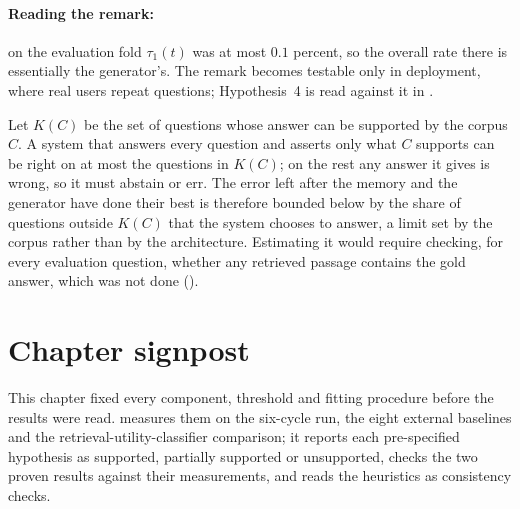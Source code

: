 \paragraph{Reading the remark:} on the evaluation fold $\tau_{1}(t)$ was at most $0.1$ percent, so the overall rate there is essentially the generator's. The remark becomes testable only in deployment, where real users repeat questions; Hypothesis~4 is read against it in .

\begin{remark}
\label{cor:corpus-floor}
Let $K(C)$ be the set of questions whose answer can be supported by the corpus $C$. A system that answers every question and asserts only what $C$ supports can be right on at most the questions in $K(C)$; on the rest any answer it gives is wrong, so it must abstain or err. The error left after the memory and the generator have done their best is therefore bounded below by the share of questions outside $K(C)$ that the system chooses to answer, a limit set by the corpus rather than by the architecture. Estimating it would require checking, for every evaluation question, whether any retrieved passage contains the gold answer, which was not done ().
\end{remark}

\section{Chapter signpost}
\label{sec:ch4-signpost}

This chapter fixed every component, threshold and fitting procedure before the results were read.  measures them on the six-cycle run, the eight external baselines and the retrieval-utility-classifier comparison; it reports each pre-specified hypothesis as supported, partially supported or unsupported, checks the two proven results against their measurements, and reads the heuristics as consistency checks.
